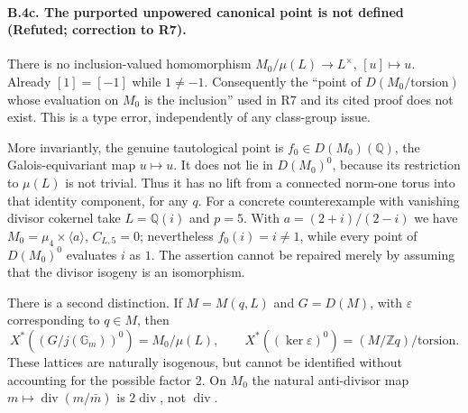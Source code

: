 \paragraph{B.4c. The purported unpowered canonical point is not defined
(Refuted; correction to R7).}
\label{B4c}
There is no inclusion-valued homomorphism
$M_0/\mu(L)\to L^\times$, $[u]\mapsto u$. Already $[1]=[-1]$ while
$1\ne-1$. Consequently the ``point of $D(M_0/\mathrm{torsion})$
whose evaluation on $M_0$ is the inclusion'' used in R7 and its cited
proof does not exist. This is a type error, independently of any
class-group issue.

More invariantly, the genuine tautological point is
$f_0\in D(M_0)(\mathbb Q)$, the Galois-equivariant map
$u\mapsto u$. It does not lie in $D(M_0)^0$, because its restriction
to $\mu(L)$ is not trivial. Thus it has no lift from a connected
norm-one torus into that identity component, for any $q$.
For a concrete counterexample with vanishing divisor cokernel take
$L=\mathbb Q(i)$ and $p=5$. With
$a=(2+i)/(2-i)$ we have
$M_0=\mu_4\times\langle a\rangle$, $C_{L,5}=0$; nevertheless
$f_0(i)=i\ne1$, while every point of $D(M_0)^0$ evaluates $i$ as $1$.
The assertion cannot be repaired merely by assuming that the divisor
isogeny is an isomorphism.

There is a second distinction. If $M=M(q,L)$ and $G=D(M)$, with
$\varepsilon$ corresponding to $q\in M$, then
\[
 X^*((G/j(\mathbb G_m))^0)=M_0/\mu(L),\qquad
 X^*((\ker\varepsilon)^0)=(M/\mathbb Z q)/\mathrm{torsion}.
\]
These lattices are naturally isogenous, but cannot be identified
without accounting for the possible factor $2$. On $M_0$ the natural
anti-divisor map $m\mapsto\operatorname{div}(m/\bar m)$ is
$2\operatorname{div}$, not $\operatorname{div}$.

